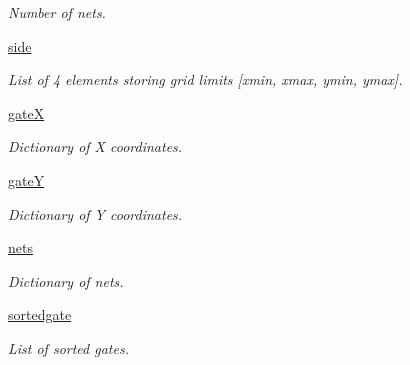 \begin{DoxyCompactItemize}
\begin{DoxyCompactList}\small\item\em Number of nets. \end{DoxyCompactList}\item 
\hyperlink{classgqp__placer_1_1mothercore_adda3ce69f8cb37fd8de8fc66e700500a}{side}\hypertarget{classgqp__placer_1_1mothercore_adda3ce69f8cb37fd8de8fc66e700500a}{}\label{classgqp__placer_1_1mothercore_adda3ce69f8cb37fd8de8fc66e700500a}

\begin{DoxyCompactList}\small\item\em List of 4 elements storing grid limits \mbox{[}xmin, xmax, ymin, ymax\mbox{]}. \end{DoxyCompactList}\item 
\hyperlink{classgqp__placer_1_1mothercore_aafb11667ac74ea67fe71d51e3eca50af}{gateX}\hypertarget{classgqp__placer_1_1mothercore_aafb11667ac74ea67fe71d51e3eca50af}{}\label{classgqp__placer_1_1mothercore_aafb11667ac74ea67fe71d51e3eca50af}

\begin{DoxyCompactList}\small\item\em Dictionary of X coordinates. \end{DoxyCompactList}\item 
\hyperlink{classgqp__placer_1_1mothercore_a56d4174c727a7daf21e8bd9a609e4d11}{gateY}\hypertarget{classgqp__placer_1_1mothercore_a56d4174c727a7daf21e8bd9a609e4d11}{}\label{classgqp__placer_1_1mothercore_a56d4174c727a7daf21e8bd9a609e4d11}

\begin{DoxyCompactList}\small\item\em Dictionary of Y coordinates. \end{DoxyCompactList}\item 
\hyperlink{classgqp__placer_1_1mothercore_a634ce0bcaab7bdc0bb511017a2d698dc}{nets}\hypertarget{classgqp__placer_1_1mothercore_a634ce0bcaab7bdc0bb511017a2d698dc}{}\label{classgqp__placer_1_1mothercore_a634ce0bcaab7bdc0bb511017a2d698dc}

\begin{DoxyCompactList}\small\item\em Dictionary of nets. \end{DoxyCompactList}\item 
\hyperlink{classgqp__placer_1_1mothercore_aca66cf3901dd7c704fffc88e8972391c}{sortedgate}\hypertarget{classgqp__placer_1_1mothercore_aca66cf3901dd7c704fffc88e8972391c}{}\label{classgqp__placer_1_1mothercore_aca66cf3901dd7c704fffc88e8972391c}

\begin{DoxyCompactList}\small\item\em List of sorted gates. \end{DoxyCompactList}\end{DoxyCompactItemize}


